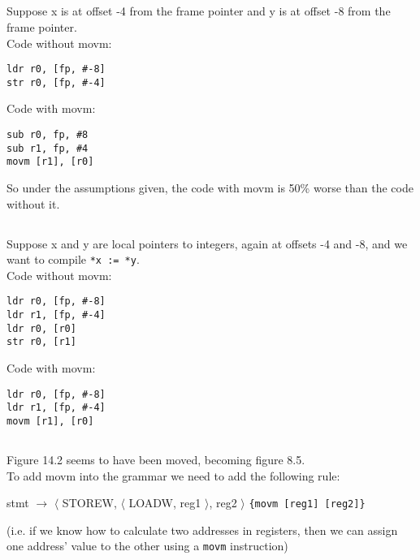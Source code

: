 \subsection{}
Suppose x is at offset -4 from the frame pointer and y is at offset -8 from the frame pointer. \\
Code without movm:

\begin{lstlisting}
ldr r0, [fp, #-8]
str r0, [fp, #-4]
\end{lstlisting}

Code with movm:

\begin{lstlisting}
sub r0, fp, #8
sub r1, fp, #4
movm [r1], [r0]
\end{lstlisting}

So under the assumptions given, the code with movm is 50\% worse than the code without it.

\subsection{}
Suppose x and y are local pointers to integers, again at offsets -4 and -8, and we want to compile \texttt{*x := *y}. \\
Code without movm:

\begin{lstlisting}
ldr r0, [fp, #-8]
ldr r1, [fp, #-4]
ldr r0, [r0]
str r0, [r1]
\end{lstlisting}

Code with movm:

\begin{lstlisting}
ldr r0, [fp, #-8]
ldr r1, [fp, #-4]
movm [r1], [r0]
\end{lstlisting}

\subsection{}
Figure 14.2 seems to have been moved, becoming figure 8.5. \\
To add movm into the grammar we need to add the following rule:

stmt $\rightarrow$ $\langle$ STOREW, $\langle$ LOADW, reg1 $\rangle$, reg2 $\rangle$         \texttt{\{movm [reg1] [reg2]\}}

(i.e. if we know how to calculate two addresses in registers, then we can assign one address' value to the other using a \texttt{movm} instruction)

\subsection{}

